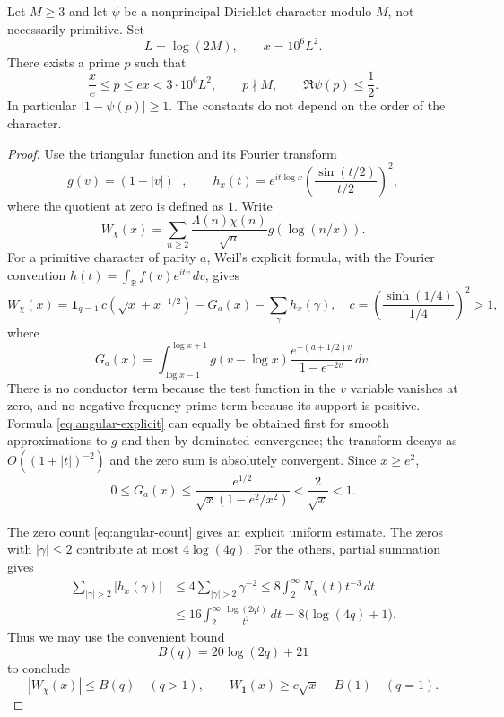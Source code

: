 \begin{lemma}
Let $M\ge3$ and let $\psi$ be a nonprincipal Dirichlet character modulo $M$,
not necessarily primitive.  Set
\[
 L=\log(2M),\qquad x=10^6 L^2.
\]
There exists a prime $p$ such that
\begin{equation}\label{eq:angular-prime}
 \frac{x}{e}\le p\le ex<3\cdot10^6L^2,
 \qquad p\nmid M,\qquad \Re\psi(p)\le\frac12.
\end{equation}
In particular $|1-\psi(p)|\ge1$.  The constants do not depend on the
order of the character.
\end{lemma}

\begin{proof}
Use the triangular function and its Fourier transform
\[
 g(v)=(1-|v|)_+,\qquad
 h_x(t)=e^{it\log x}\left(\frac{\sin(t/2)}{t/2}\right)^2,
\]
where the quotient at zero is defined as $1$.
Write
\[
 W_\chi(x)=\sum_{n\ge2}\frac{\Lambda(n)\chi(n)}{\sqrt n}
                   g(\log(n/x)).
\]
For a primitive character of parity $a$, Weil's explicit formula, with
the Fourier convention $h(t)=\int_{\mathbb R}f(v)e^{itv}\,dv$, gives
\begin{equation}\label{eq:angular-explicit}
 W_\chi(x)=\mathbf1_{q=1}\,c(\sqrt x+x^{-1/2})
               -G_a(x)-\sum_\gamma h_x(\gamma),
 \quad
 c=\left(\frac{\sinh(1/4)}{1/4}\right)^2>1,
\end{equation}
where
\[
 G_a(x)=\int_{\log x-1}^{\log x+1}
    g(v-\log x)\frac{e^{-(a+1/2)v}}{1-e^{-2v}}\,dv.
\]
There is no conductor term because the test function in the $v$ variable
vanishes at zero, and no negative-frequency prime term because its support
is positive.  Formula \eqref{eq:angular-explicit} can equally be obtained
first for smooth approximations to $g$ and then by dominated convergence;
the transform decays as $O((1+|t|)^{-2})$ and the zero sum is absolutely
convergent.  Since $x\ge e^2$,
\[
 0\le G_a(x)\le\frac{e^{1/2}}{\sqrt x(1-e^2/x^2)}
                         <\frac2{\sqrt x}<1.
\]

The zero count \eqref{eq:angular-count} gives an explicit uniform estimate.
The zeros with $|\gamma|\le2$ contribute at most $4\log(4q)$.
For the others, partial summation gives
\begin{align*}
 \sum_{|\gamma|>2}|h_x(\gamma)|
 &\le4\sum_{|\gamma|>2}\gamma^{-2}
 \le8\int_2^\infty N_\chi(t)t^{-3}\,dt\\
 &\le16\int_2^\infty\frac{\log(2qt)}{t^2}\,dt
 =8\bigl(\log(4q)+1\bigr).
\end{align*}
Thus we may use the convenient bound
\[
 B(q)=20\log(2q)+21
\]
to conclude
\[
 |W_\chi(x)|\le B(q)\quad(q>1),\qquad
 W_{\mathbf1}(x)\ge c\sqrt x-B(1)\quad(q=1).
\]


\end{proof}
